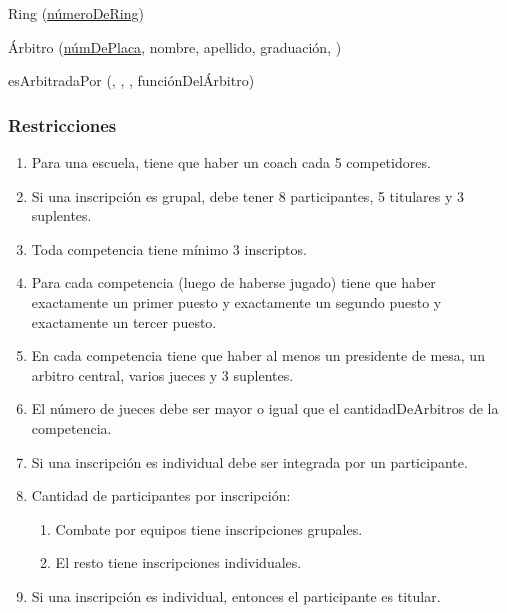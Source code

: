 \par Ring (\underline{númeroDeRing})
\par Árbitro (\underline{númDePlaca}, nombre, apellido, graduación, )

\par esArbitradaPor (\underline{}, \underline{}, , funciónDelÁrbitro)


\subsubsection{Restricciones}

\begin{enumerate}
  \item Para una escuela, tiene que haber un coach cada 5 competidores.
  \item Si una inscripción es grupal, debe tener 8 participantes, 5 titulares y 3 suplentes.
  \item Toda competencia tiene mínimo 3 inscriptos.
  \item Para cada competencia (luego de haberse jugado) tiene que haber exactamente un primer puesto y exactamente un segundo puesto y exactamente un tercer puesto.
  \item En cada competencia tiene que haber al menos un presidente de mesa, un arbitro central, varios jueces y 3 suplentes.
  \item El número de jueces debe ser mayor o igual que el cantidadDeArbitros de la competencia.


  \item Si una inscripción es individual debe ser integrada por un participante.
  \item Cantidad de participantes por inscripción: \begin{enumerate}
    \item Combate por equipos tiene inscripciones grupales.
    \item El resto tiene inscripciones individuales. \end{enumerate}
  \item  Si una inscripción es individual, entonces el participante es titular.


\end{enumerate}
